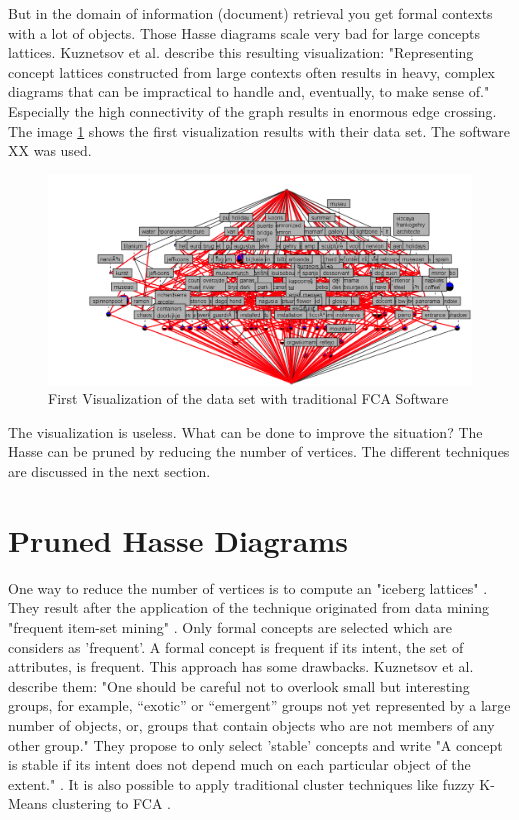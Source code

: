\documentclass[11pt]{report}
\begin{document}
But in the domain of information (document) retrieval you get formal contexts with a lot of objects. Those Hasse diagrams scale very bad for large concepts lattices. Kuznetsov et al. \cite{Kuznetsov20072}  describe this resulting visualization: "Representing concept lattices constructed from large contexts often results in heavy, complex diagrams that can be impractical to handle and, eventually, to make sense of." Especially the high connectivity of the graph results in enormous edge crossing. The image \ref{figure:firstVisualizaion} shows the first visualization results with their data set. The software XX was used. \\

\begin{figure}[h]
\caption{First Visualization of the data set with traditional FCA Software}
\label{figure:firstVisualizaion}
	\centering
	\includegraphics[width=\linewidth]{./images/firstVisualization}
\end{figure}

The visualization is useless. What can be done to improve the situation? The Hasse can be pruned by reducing the number of vertices. The different techniques are discussed in the next section.

\section{Pruned Hasse Diagrams}

One way to reduce the number of vertices is to compute an "iceberg lattices" \cite{Stumme2002}. They result after the application of the technique originated from data mining "frequent item-set mining" \cite{Agrawal1993}. Only formal concepts are selected which are considers as 'frequent'. A formal concept is frequent if its intent, the set of attributes, is frequent. This approach has some drawbacks. Kuznetsov et al. \cite{Kuznetsov20072} describe them: "One should be careful not to overlook small but interesting groups, for example, “exotic” or “emergent” groups not yet represented by a large number of objects, or, groups that contain objects who are not members of any other group." They propose to only select 'stable' concepts and write "A concept is stable if its intent does not depend much on each particular object of the extent." \cite{Kuznetsov20072}. It is also possible to apply traditional cluster techniques like fuzzy K-Means clustering to FCA \cite{AswaniKumar2010}. \\
\end{document}

